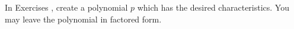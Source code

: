 {\noindent In Exercises}
{, create a polynomial $p$ which has the desired characteristics.  You may leave the polynomial in factored form. }
